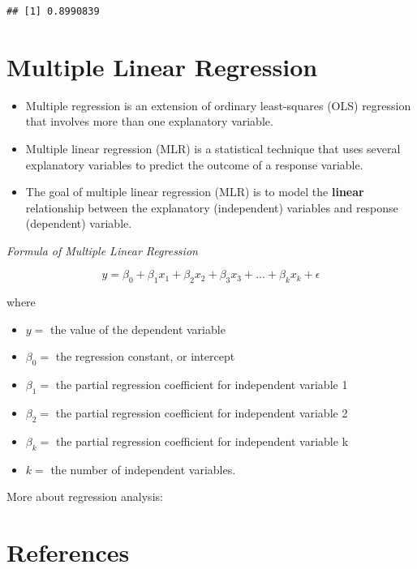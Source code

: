 \documentclass[]{book}
\providecommand{\tightlist}{%
  \setlength{\itemsep}{0pt}\setlength{\parskip}{0pt}}
\begin{document}
\begin{verbatim}
## [1] 0.8990839
\end{verbatim}

\hypertarget{multiple-linear-regression}{%
\section{Multiple Linear Regression}\label{multiple-linear-regression}}

\begin{itemize}
\tightlist
\item
  Multiple regression is an extension of ordinary least-squares (OLS) regression that involves more than one explanatory variable.
\item
  Multiple linear regression (MLR) is a statistical technique that uses several explanatory variables to predict the outcome of a response variable.
\item
  The goal of multiple linear regression (MLR) is to model the \textbf{linear} relationship between the explanatory (independent) variables and response (dependent) variable.
\end{itemize}

\emph{Formula of Multiple Linear Regression}

\[y=\beta_0+\beta_1 x_1+\beta_2 x_2+\beta_3 x_3+ \dots + \beta_k x_k+ \epsilon\]

where

\begin{itemize}
\tightlist
\item
  \(y =\) the value of the dependent variable
\item
  \(\beta_0 =\) the regression constant, or intercept
\item
  \(\beta_1 =\) the partial regression coefficient for independent variable 1
\item
  \(\beta_2 =\) the partial regression coefficient for independent variable 2
\item
  \(\beta_k =\) the partial regression coefficient for independent variable k
\item
  \(k =\) the number of independent variables.
\end{itemize}

More about regression analysis:

\hypertarget{references-8}{%
\section*{References}\label{references-8}}
\end{document}

